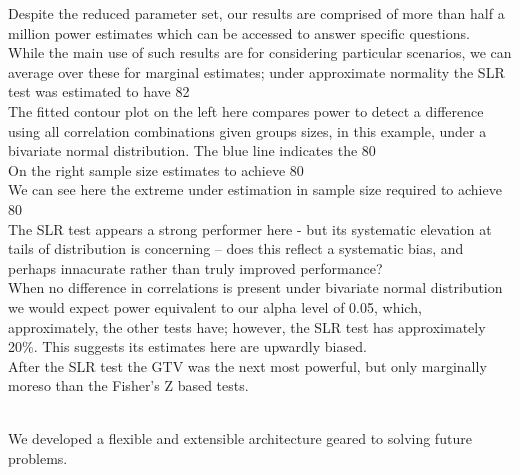 Despite the reduced parameter set, our results are comprised of more than half a million power estimates which can be accessed to answer specific questions.
\\
While the main use of such results are for considering particular scenarios, we can average over these for marginal estimates; under approximate normality the SLR test was estimated to have 82%
\\
The fitted contour plot on the left here compares power to detect a difference using all correlation combinations given groups sizes, in this example, under a bivariate normal distribution.  The blue line indicates the 80%
\\
On the right sample size estimates to achieve 80%
\\
We can see here the extreme under estimation in sample size required to achieve 80%
\\
The SLR test appears a strong performer here - but its systematic elevation at tails of distribution is concerning -- does this reflect a systematic bias, and perhaps innacurate rather than truly improved performance?  
\\
When no difference in correlations is present under bivariate normal distribution we would expect power equivalent to our alpha level of 0.05, which, approximately, the other tests have; however, the SLR test has approximately 20\%.  This suggests its estimates here are upwardly biased.
\\
After the SLR test the GTV was the next most powerful, but only marginally moreso than the Fisher's Z based tests.  


\\
We developed a flexible and extensible architecture geared to solving future problems.
\\

